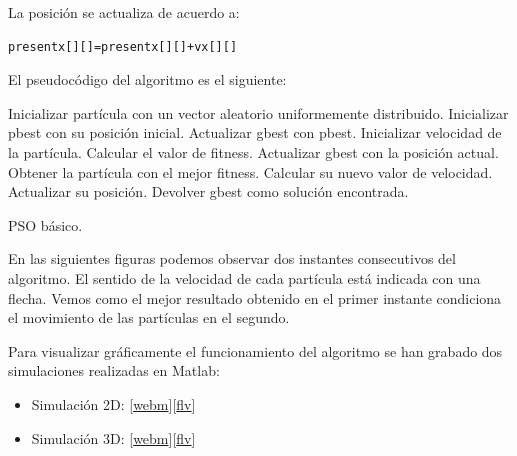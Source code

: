 \documentclass[a4paper,12pt,titlepage]{article}
\begin{document}
La posición se actualiza de acuerdo a:

\begin{lstlisting}
presentx[][]=presentx[][]+vx[][]
\end{lstlisting}

El pseudocódigo del algoritmo es el siguiente:
\newpage

\begin{algorithm}[!ht]
	\begin{algorithmic}[1]
		\STATE Inicializar partícula con un vector aleatorio uniformemente distribuido.
		\STATE Inicializar pbest con su posición inicial.
			\STATE Actualizar gbest con pbest.
		\ENDIF
		\STATE Inicializar velocidad de la partícula.
	\ENDFOR
	\REPEAT 
			\STATE Calcular el valor de fitness.
				\STATE Actualizar gbest con la posición actual.
			\ENDIF
		\ENDFOR
		\STATE Obtener la partícula con el mejor fitness.
			\STATE Calcular su nuevo valor de velocidad.
			\STATE Actualizar su posición.
		\ENDFOR		
	\STATE Devolver gbest como solución encontrada.
	\end{algorithmic}
\caption{PSO básico.}
\label{alg:algoritmoRaro}
\end{algorithm}

En las siguientes figuras podemos observar dos instantes consecutivos del algoritmo. El sentido de la velocidad de cada partícula está indicada con una flecha. Vemos como el mejor resultado obtenido en el primer instante condiciona el movimiento de las partículas en el segundo.

Para visualizar gráficamente el funcionamiento del algoritmo se han grabado dos simulaciones realizadas en Matlab:

\begin{itemize}[noitemsep]
	\item Simulación 2D: [\href{https://raw.githubusercontent.com/davidmigloz/evolutionary-computation/master/T1_PSO/res/pso_demo_2d.webm}{webm}][\href{https://raw.githubusercontent.com/davidmigloz/evolutionary-computation/master/T1_PSO/res/pso_demo_2d.flv}{flv}]
	\item Simulación 3D: [\href{https://raw.githubusercontent.com/davidmigloz/evolutionary-computation/master/T1_PSO/res/pso_demo_3d.webm}{webm}][\href{https://raw.githubusercontent.com/davidmigloz/evolutionary-computation/master/T1_PSO/res/pso_demo_3d.flv}{flv}]
\end{itemize}
\end{document}
